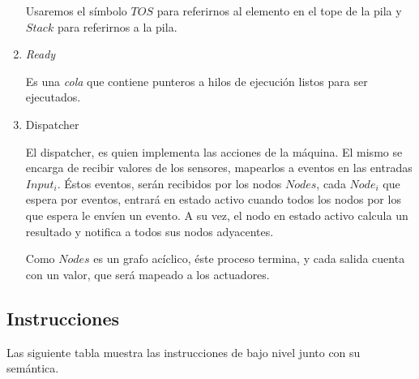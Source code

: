 \begin{enumerate}
Usaremos el símbolo $TOS$ para referirnos al elemento en el tope
de la pila y $Stack$ para referirnos a la pila.

\item \emph{Ready}

Es una \emph{cola} que contiene punteros a hilos de ejecución
listos para ser ejecutados.


\item Dispatcher

El dispatcher, es quien implementa las acciones de la máquina.
El mismo se encarga de recibir valores de los sensores, mapearlos
a eventos en las entradas $Input_i$.
Éstos eventos, serán recibidos por los nodos $Nodes$, cada $Node_i$
que espera por eventos, entrará en estado activo cuando todos los nodos
por los que espera le envíen un evento.
A su vez, el nodo en estado activo calcula un resultado y notifica a
todos sus nodos adyacentes.

Como $Nodes$ es un grafo acíclico, éste proceso termina, y cada
salida cuenta con un valor, que será mapeado a los actuadores.

\end{enumerate}

\subsection{Instrucciones}

Las siguiente tabla muestra las instrucciones de bajo nivel junto con su semántica.

